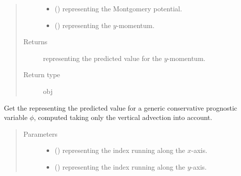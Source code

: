\documentclass[letterpaper,10pt,english]{sphinxmanual}
\begin{document}
\begin{fulllineitems}
\begin{fulllineitems}
\begin{quote}
\begin{description}
\begin{itemize}
\item {} 
 () \textendash{}  representing the Montgomery potential.

\item {} 
 () \textendash{}  representing the \(y\)-momentum.

\end{itemize}

\item[{Returns}] \leavevmode
{} representing the predicted value for the \(y\)-momentum.

\item[{Return type}] \leavevmode
obj

\end{description}\end{quote}

\end{fulllineitems}


\begin{fulllineitems}
\label{\detokenize{api:dycore.flux_isentropic_maccormack.FluxIsentropicMacCormack._get_maccormack_vertical_predicted_value}}
Get the  representing the predicted value for a generic conservative prognostic
variable \(\phi\), computed taking only the vertical advection into account.
\begin{quote}\begin{description}
\item[{Parameters}] \leavevmode\begin{itemize}
\item {} 
 () \textendash{}  representing the index running along the \(x\)-axis.

\item {} 
 () \textendash{}  representing the index running along the \(y\)-axis.


\end{itemize}
\end{description}
\end{quote}
\end{fulllineitems}
\end{fulllineitems}
\end{document}

